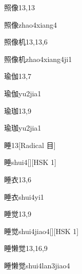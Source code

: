 \begin{entry}{照像}{13,13}
  \begin{phonetics}{照像}{zhao4xiang4}
  \end{phonetics}
\end{entry}

\begin{entry}{照像机}{13,13,6}
  \begin{phonetics}{照像机}{zhao4xiang4ji1}
  \end{phonetics}
\end{entry}

\begin{entry}{瑜伽}{13,7}
  \begin{phonetics}{瑜伽}{yu2jia1}
  \end{phonetics}
\end{entry}

\begin{entry}{瑜珈}{13,9}
  \begin{phonetics}{瑜珈}{yu2jia1}
  \end{phonetics}
\end{entry}

\begin{entry}{睡}{13}[Radical 目]
  \begin{phonetics}{睡}{shui4}[][HSK 1]
  \end{phonetics}
\end{entry}

\begin{entry}{睡衣}{13,6}
  \begin{phonetics}{睡衣}{shui4yi1}
  \end{phonetics}
\end{entry}

\begin{entry}{睡觉}{13,9}
  \begin{phonetics}{睡觉}{shui4jiao4}[][HSK 1]
  \end{phonetics}
\end{entry}

\begin{entry}{睡懒觉}{13,16,9}
  \begin{phonetics}{睡懒觉}{shui4lan3jiao4}
  \end{phonetics}
\end{entry}

